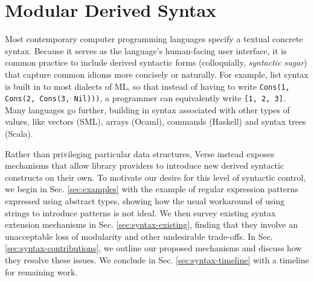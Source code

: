 
\section{Modular Derived Syntax}\label{sec:syntax}
Most contemporary computer programming languages specify a textual concrete syntax. Because it serves as the language's human-facing user interface, it is common practice to include  derived syntactic forms (colloquially, \emph{syntactic sugar}) that capture common idioms more concisely or naturally. %
For example,  list syntax is built in to most dialects of ML, so that instead of having to write \lstinline{Cons(1, Cons(2, Cons(3, Nil)))}, a programmer can equivalently write \lstinline{[1, 2, 3]}. Many languages go further, building in syntax associated with other types of values, like vectors (SML), arrays (Ocaml), commands (Haskell) and syntax trees (Scala).  %

Rather than privileging  particular data structures, Verse instead exposes mechanisms that allow library providers to introduce new derived syntactic constructs on their own. %
To motivate our desire for this level of syntactic control, we begin in Sec. \ref{sec:examples} with the example of regular expression patterns expressed using abstract types, showing how the usual workaround of using strings to introduce patterns is not ideal. We then survey existing syntax extension mechanisms in Sec. \ref{sec:syntax-existing}, finding that they involve an unacceptable loss of modularity and other undesirable trade-offs. In Sec. \ref{sec:syntax-contributions}, we outline our proposed mechanisms and discuss how they resolve these issues. We conclude in Sec. \ref{sec:syntax-timeline} with a timeline for remaining work.


